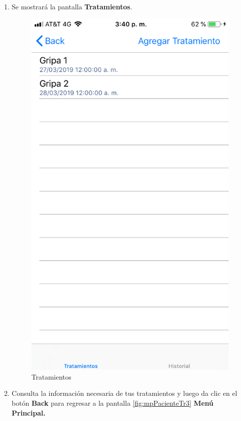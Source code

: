\begin{enumerate}
	\item Se mostrará la pantalla \textbf{Tratamientos}. 
	\newpage
	\begin{figure}[!htbp]			
		\hypertarget{fig:Tratamientos}{\hspace{1pt}}
		\begin{center}
			\includegraphics[height=0.4\textheight]{Paciente/ConsultarTratamiento/images/Tratamientos}
			\caption{Tratamientos}
			\label{fig:Tratamientos}
		\end{center}
	\end{figure}

	\item Consulta la información necesaria de tus tratamientos y luego da clic en el botón \textbf{Back} para regresar a la pantalla \ref{fig:mpPacienteTr3} \textbf{Menú Principal.}
	
\end{enumerate}

